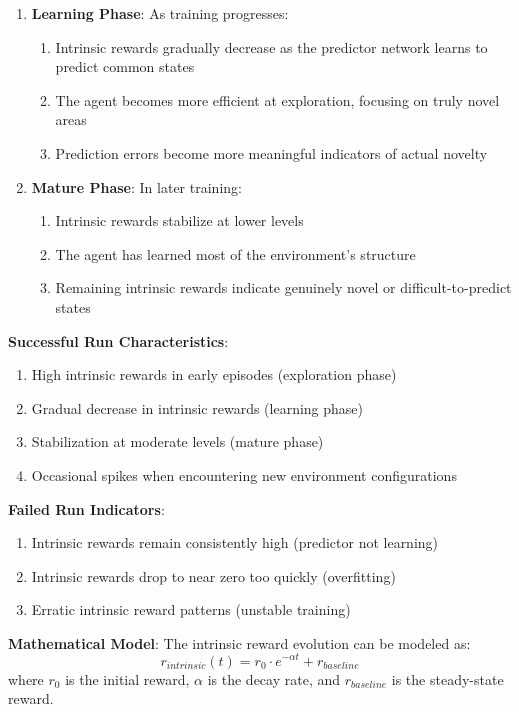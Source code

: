 \documentclass[12pt]{article}
\begin{document}
{{{\begin{enumerate}
    \item \textbf{Learning Phase}: As training progresses:
    \begin{enumerate}
        \item Intrinsic rewards gradually decrease as the predictor network learns to predict common states
        \item The agent becomes more efficient at exploration, focusing on truly novel areas
        \item Prediction errors become more meaningful indicators of actual novelty
    \end{enumerate}
    
    \item \textbf{Mature Phase}: In later training:
    \begin{enumerate}
        \item Intrinsic rewards stabilize at lower levels
        \item The agent has learned most of the environment's structure
        \item Remaining intrinsic rewards indicate genuinely novel or difficult-to-predict states
    \end{enumerate}
\end{enumerate}

\textbf{Successful Run Characteristics}:
\begin{enumerate}
    \item High intrinsic rewards in early episodes (exploration phase)
    \item Gradual decrease in intrinsic rewards (learning phase)
    \item Stabilization at moderate levels (mature phase)
    \item Occasional spikes when encountering new environment configurations
\end{enumerate}

\textbf{Failed Run Indicators}:
\begin{enumerate}
    \item Intrinsic rewards remain consistently high (predictor not learning)
    \item Intrinsic rewards drop to near zero too quickly (overfitting)
    \item Erratic intrinsic reward patterns (unstable training)
\end{enumerate}

\textbf{Mathematical Model}: The intrinsic reward evolution can be modeled as:
\begin{equation}
r_{intrinsic}(t) = r_0 \cdot e^{-\alpha t} + r_{baseline}
\end{equation}
where $r_0$ is the initial reward, $\alpha$ is the decay rate, and $r_{baseline}$ is the steady-state reward.

}}}
\end{document}
